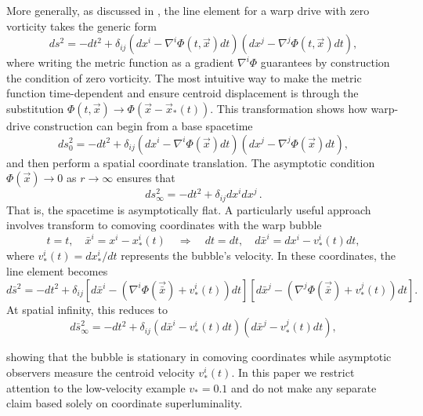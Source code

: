 \documentclass[11pt]{article}
\begin{document}
More generally, as discussed in \cite{Schuster:2023ADMmass}, the line element for a warp drive with zero vorticity takes the generic form
\begin{equation}
\label{eq:zero-vorticity}
ds^2 = -dt^2 + \delta_{ij} (dx^i - \nabla^i\Phi(t,\vec{x})dt)(dx^j - \nabla^j\Phi(t,\vec{x})dt),
\end{equation}
where writing the metric function as a gradient $\nabla^i\Phi$ guarantees by construction the condition of zero vorticity. The most intuitive way to make the metric function time-dependent and ensure centroid displacement is through the substitution $\Phi(t,\vec{x}) \to \Phi(\vec{x} - \vec{x}_*(t))$.
This transformation shows how warp-drive construction can begin from a base spacetime
\begin{equation}
\label{eq:base-space}
ds^2_0 = -dt^2 + \delta_{ij} (dx^i - \nabla^i\Phi(\vec{x})dt)(dx^j - \nabla^j\Phi(\vec{x})dt),
\end{equation}
and then perform a spatial coordinate translation. The asymptotic condition $\Phi(\vec{x}) \to 0$ as $r \to \infty$ ensures that
\begin{equation}
    ds^2_\infty = -dt^2 + \delta_{ij} dx^i dx^j\,.
\end{equation}
That is, the spacetime is asymptotically flat. A particularly useful approach involves transform to comoving coordinates with the warp bubble
\begin{equation}
t = t, \quad \bar{x}^i = x^i - x^i_*(t) \quad \Rightarrow \quad dt = dt, \quad d\bar{x}^i = dx^i - v^i_*(t)dt,
\end{equation}
where $v^i_*(t) = dx^i_*/dt$ represents the bubble's velocity. In these coordinates, the line element becomes
\begin{equation}
\label{eq:comoving-line-element}
d\bar{s}^2 = -dt^2 + \delta_{ij} \left[d\bar{x}^i - (\nabla^i\Phi(\vec{\bar{x}})+v_*^i(t))dt\right]\left[d\bar{x}^j - (\nabla^j\Phi(\vec{\bar{x}})+v_*^j(t))dt\right].
\end{equation}
At spatial infinity, this reduces to
\begin{equation}
d\bar{s}^2_\infty = -dt^2 + \delta_{ij} (d\bar{x}^i - v_*^i(t)dt)(d\bar{x}^j - v_*^j(t)dt),
\end{equation}

showing that the bubble is stationary in comoving coordinates while asymptotic observers measure the centroid velocity $v_*^i(t)$. In this paper we restrict attention to the low-velocity example $v_*=0.1$ and do not make any separate claim based solely on coordinate superluminality.
\end{document}
